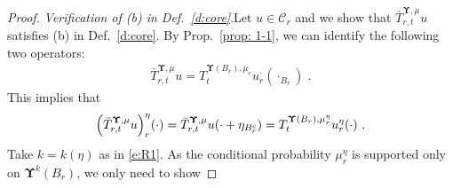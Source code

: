 \documentclass[11pt,letterpaper]{amsart}
\newcommand{\comma}{\,\,\mathrm{,}\;\,}
\newcommand{\fstop}{\,\,\mathrm{.}}
\newcommand{\QP}{{\mu}}
\newcommand{\dUpsilon}{{\mathbf \Upsilon}}
\newcommand{\U}{\dUpsilon}
\renewcommand{\1}{\mathbf 1}
\numberwithin{equation}{section}
\theoremstyle{plain}
\theoremstyle{definition}
\theoremstyle{remark}
\renewcommand{\paragraph}[1]{\medskip\emph{#1}.\quad}
\begin{document}
\begin{proof}
\paragraph{Verification of (b) in Def.~\ref{d:core}}Let $u \in \mathcal C_r$ and we show that $\bar{T}_{r, t}^{\U, \QP}u$ satisfies   (b) in Def.~\ref{d:core}. 
By Prop.~\ref{prop: 1-1}, we can identify the following two operators:
\begin{align*} 
\bar{T}_{r, t}^{\U, \QP} u=T_{t}^{\U(B_r), \QP_r^\cdot}u_{r}^{\cdot}(\cdot_{B_r})  \fstop
\end{align*}
This implies that 
\begin{align*} 
\Bigl( \bar{T}_{r, t}^{\U, \QP} u \Bigr)_r^\eta(\cdot)=\bar{T}_{r, t}^{\U, \QP} u (\cdot + \eta_{B_r^c})=T_{t}^{\U(B_r), \QP_r^\eta}u_{r}^{\eta}(\cdot)   \fstop
\end{align*}
%
Take $k=k(\eta)$ as in \eqref{e:R1}. As the conditional probability $\QP_{r}^{\eta}$ is supported only on $\U^k(B_r)$, we only need to show 

\end{proof}
\end{document}
